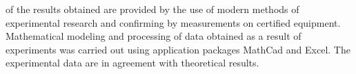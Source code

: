 
{\validity} of the results obtained are provided by the use of modern methods of experimental research and confirming by measurements on certified equipment. Mathematical modeling and processing of data obtained as a result of experiments was carried out using application packages MathCad and Excel. The experimental data are in agreement with theoretical results.

